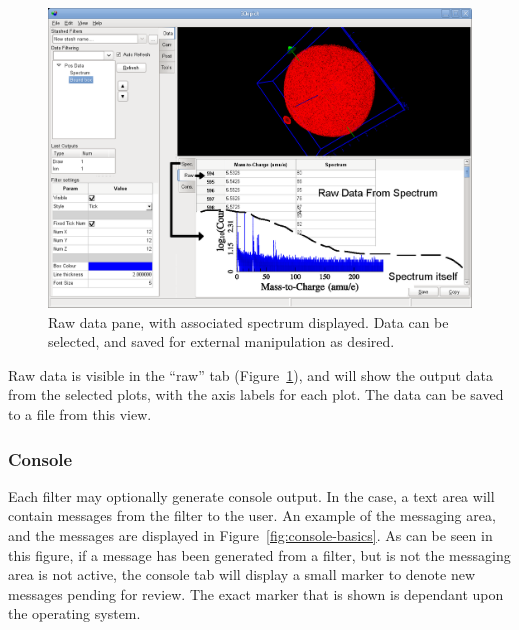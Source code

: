 \documentclass[10pt]{article}
\begin{document}
\begin{figure}[ht]
\centering
 \includegraphics[width=0.85 \textwidth,keepaspectratio=true]{./figures/spectrum-raw.png}

 \caption{Raw data pane, with associated spectrum displayed. Data can be selected, and saved for external manipulation as desired.}
\label{fig:raw-basics}
\end{figure}


Raw data is visible in the ``raw'' tab (Figure~\ref{fig:raw-basics}), and will show the output data from the selected plots, with the axis labels for each plot. The data can be saved to a file from this view.



\subsubsection{Console}
Each filter may optionally generate console output. In the case, a text area will contain messages from the filter to the user. An example of the messaging area, and the messages are displayed in Figure~\ref{fig:console-basics}. As can be seen in this figure, if a message has been generated from a filter, but is not the messaging area is not active, the console tab will display a small marker to denote new messages pending for review. The exact marker that is shown is dependant upon the operating system.
\end{document}
